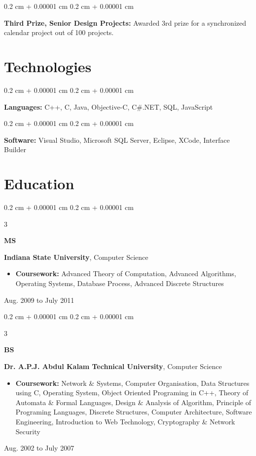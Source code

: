 \documentclass[10pt, letterpaper]{article}
\newenvironment{highlights}{
	\begin{itemize}[
		topsep=0.10 cm,
		parsep=0.10 cm,
		partopsep=0pt,
		itemsep=0pt,
		leftmargin=0.4 cm + 10pt
		]
	}{
	\end{itemize}
} %
\newenvironment{onecolentry}{
	\begin{adjustwidth}{
			0.2 cm + 0.00001 cm
		}{
			0.2 cm + 0.00001 cm
		}
	}{
	\end{adjustwidth}
} %
\newenvironment{threecolentry}[3][]{
	\onecolentry
	\def\thirdColumn{#3}
	\setcolumnwidth{1 cm, \fill, 4.5 cm}
	\begin{paracol}{3}
		\raggedright #2 \switchcolumn
	}{
		\switchcolumn \raggedleft \thirdColumn
	\end{paracol}
	\endonecolentry
} %
\begin{document}
	\vspace{0.2 cm}
	
	\begin{onecolentry}
		\textbf{Third Prize, Senior Design Projects:} Awarded 3rd prize for a synchronized calendar project out of 100 projects.
	\end{onecolentry}
	
	
	
	\section{Technologies}
	
	
	\begin{onecolentry}
		\textbf{Languages:} C++, C, Java, Objective-C, C\#.NET, SQL, JavaScript
	\end{onecolentry}
	
	\vspace{0.2 cm}
	
	\begin{onecolentry}
		\textbf{Software:} Visual Studio, Microsoft SQL Server, Eclipse, XCode, Interface Builder
	\end{onecolentry}
	
	
	
	\section{Education}
	
	
	\begin{threecolentry}{\textbf{MS}}{
			Aug. 2009 to July 2011
		}
		\textbf{Indiana State University}, Computer Science
		\begin{highlights}
			\item \textbf{Coursework:} Advanced Theory of Computation, Advanced Algorithms, Operating Systems, Database Process, Advanced Discrete Structures
		\end{highlights}
	\end{threecolentry}
	
	\vspace{0.2 cm}
	
	\begin{threecolentry}{\textbf{BS}}{
			Aug. 2002 to July 2007
		}
		\textbf{Dr. A.P.J. Abdul Kalam Technical University}, Computer Science
		\begin{highlights}
			\item \textbf{Coursework:} Network \& Systems, Computer Organisation, Data Structures using C, Operating System, Object Oriented Programing in C++, Theory of Automata \& Formal Languages, Design \& Analysis of Algorithm, Principle of Programing Languages, Discrete Structures, Computer Architecture, Software Engineering, Introduction to Web Technology, Cryptography \& Network Security
		\end{highlights}
	\end{threecolentry}
	
	
	
	
\end{document}
